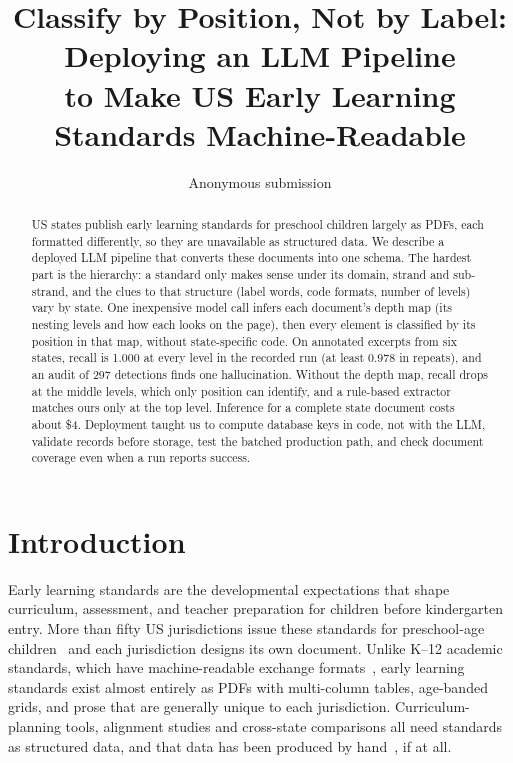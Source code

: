 \documentclass[11pt]{article}
\title{Classify by Position, Not by Label: Deploying an LLM Pipeline\\
to Make US Early Learning Standards Machine-Readable}
\author{Anonymous submission}
\begin{document}
\maketitle

\begin{abstract}
  US states publish early learning standards for preschool children largely as PDFs, each formatted differently, so they are unavailable as structured data. We describe a deployed LLM pipeline that converts these documents into one schema. The hardest part is the hierarchy: a standard only makes sense under its domain, strand and sub-strand, and the clues to that structure (label words, code formats, number of levels) vary by state. One inexpensive model call infers each document's depth map (its nesting levels and how each looks on the page), then every element is classified by its position in that map, without state-specific code. On annotated excerpts from six states, recall is 1.000 at every level in the recorded run (at least 0.978 in repeats), and an audit of 297 detections finds one hallucination. Without the depth map, recall drops at the middle levels, which only position can identify, and a rule-based extractor matches ours only at the top level. Inference for a complete state document costs about \$4. Deployment taught us to compute database keys in code, not with the LLM, validate records before storage, test the batched production path, and check document coverage even when a run reports success.
\end{abstract}

\section{Introduction}
\label{sec:introduction}

Early learning standards are the developmental expectations that shape
curriculum, assessment, and teacher preparation for children before
kindergarten entry. More than fifty US jurisdictions issue these standards for
preschool-age children~\citep{ncecqa_elgs} and each jurisdiction designs its own document. Unlike K--12 academic standards, which have machine-readable exchange
formats~\citep{sutton2008achievement,1edtech2017case}, early learning standards
exist almost entirely as PDFs with multi-column tables, age-banded grids, and prose that are generally unique to each jurisdiction. Curriculum-planning tools, alignment
studies and cross-state comparisons all need standards as structured data, and
that data has been produced by hand~\citep{scottlittle2006conceptualization}, if at all.
\end{document}
